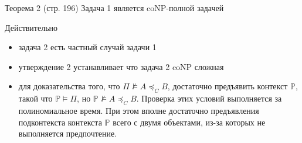 \documentclass{beamer}
\begin{document}
\begin{frame}
  \begin{block}{Теорема 2 (стр. 196)}
    Задача 1 является coNP-полной задачей 
  \end{block}
  Действительно
  \begin{itemize}
    \item задача 2 есть частный случай задачи 1
    \item утверждение 2 устанавливает что задача 2 coNP сложная
    \item для доказательства того, что $\Pi\not\models A\preceq_C B$, достаточно предъявить контекст $\mathbb{P}$, такой что $\mathbb{P}\models \Pi$, но $\mathbb{P}\not\models A\preceq_C B$. Проверка этих условий выполняется за полиномиальное время. При этом вполне достаточно предъявления подконтекста контекста $\mathbb{P}$ всего с двумя объектами, из-за которых не выполняется предпочтение.
  \end{itemize}
\end{frame}

\end{document}
